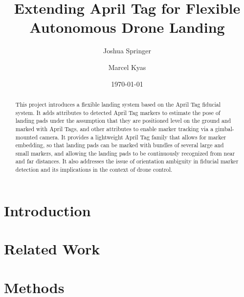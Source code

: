 \documentclass[conference]{IEEEtran}
\author{Joshua Springer \and Marcel Kyas}
\title{Extending April Tag for Flexible Autonomous Drone Landing}
\date{\specialdate\today}
\begin{document}
    \maketitle

    \begin{abstract}
        This project introduces a flexible landing system based on the April Tag\cite{apriltag3_paper} fiducial system.
        It adds attributes to detected April Tag markers to estimate the pose of landing pads
        under the assumption that they are positioned level on the ground and marked with April Tags,
        and other attributes to enable marker tracking via a gimbal-mounted camera.
        It provides a lightweight April Tag family that allows for marker embedding,
        so that landing pads can be marked with bundles of several large and small markers,
        and allowing the landing pads to be continuously recognized from near and far distances.
        It also addresses the issue of orientation ambiguity in fiducial marker detection
        and its implications in the context of drone control.
    \end{abstract}

    \section{Introduction}
    \label{section:introduction}
    

    \section{Related Work}
    \label{section:related_work}
    

    \section{Methods}
    \label{section:methods}
    

    
    
\end{document}
